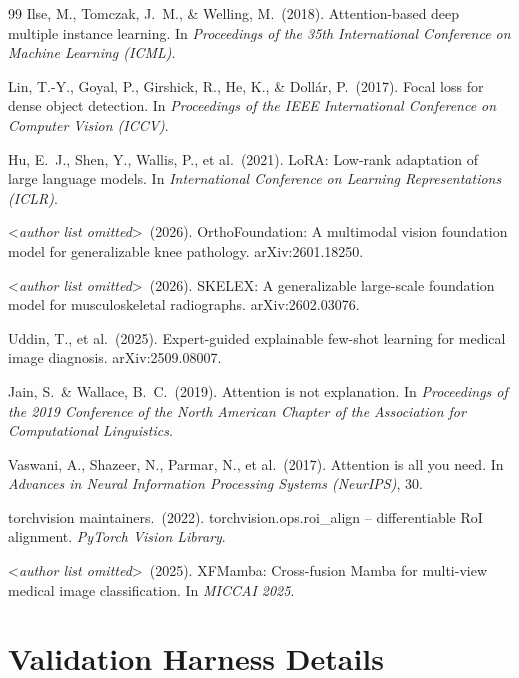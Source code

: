 \documentclass{article}
\begin{document}
{\begin{thebibliography}{99}
  Ilse, M., Tomczak, J.\ M., \& Welling, M.\ (2018).
  Attention-based deep multiple instance learning.
  In {\it Proceedings of the 35th International Conference on Machine Learning (ICML)}.

  Lin, T.-Y., Goyal, P., Girshick, R., He, K., \& Dollár, P.\ (2017).
  Focal loss for dense object detection.
  In {\it Proceedings of the IEEE International Conference on Computer Vision (ICCV)}.

  Hu, E.\ J., Shen, Y., Wallis, P., et al.\ (2021).
  LoRA: Low-rank adaptation of large language models.
  In {\it International Conference on Learning Representations (ICLR)}.

  \textless\textit{author list omitted}\textgreater\ (2026).
  OrthoFoundation: A multimodal vision foundation model for generalizable knee pathology.
  arXiv:2601.18250.

  \textless\textit{author list omitted}\textgreater\ (2026).
  SKELEX: A generalizable large-scale foundation model for musculoskeletal radiographs.
  arXiv:2602.03076.

  Uddin, T., et al.\ (2025).
  Expert-guided explainable few-shot learning for medical image diagnosis.
  arXiv:2509.08007.

  Jain, S.\ \& Wallace, B.\ C.\ (2019).
  Attention is not explanation.
  In {\it Proceedings of the 2019 Conference of the North American Chapter of the Association for Computational Linguistics}.

  Vaswani, A., Shazeer, N., Parmar, N., et al.\ (2017).
  Attention is all you need.
  In {\it Advances in Neural Information Processing Systems (NeurIPS)}, 30.

  torchvision maintainers.\ (2022).
  torchvision.ops.roi\_align -- differentiable RoI alignment.
  {\it PyTorch Vision Library}.

  \textless\textit{author list omitted}\textgreater\ (2025).
  XFMamba: Cross-fusion Mamba for multi-view medical image classification.
  In {\it MICCAI 2025}.

\end{thebibliography}
}

\appendix
\section{Validation Harness Details}
\end{document}
